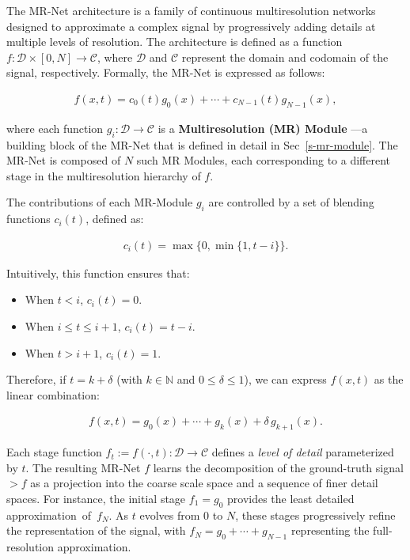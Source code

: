 The MR-Net architecture is a family of continuous multiresolution networks designed to approximate a complex signal by progressively adding details at multiple levels of resolution. The architecture is defined as a function \( f:\mathcal{D} \times [0,N] \to \mathcal{C} \), where \(\mathcal{D}\) and \(\mathcal{C}\) represent the domain and codomain of the signal, respectively. Formally, the MR-Net is expressed as follows:

\begin{align}\label{e-mrnet}
f(x,t) = c_0(t) g_0(x) + \cdots + c_{N-1}(t) g_{N-1}(x),
\end{align}

where each function \( g_i : \mathcal{D} \to \mathcal{C} \) is a \textbf{Multiresolution (MR) Module} —a building block of the MR-Net that is defined in detail in Sec~\ref{s-mr-module}. The MR-Net is composed of \( N \) such MR Modules, each corresponding to a different stage in the multiresolution hierarchy of \( f \). 

The contributions of each MR-Module \( g_i \) are controlled by a set of blending functions \( c_i(t) \), defined as:

\begin{align}\label{e-control}
c_i(t) = \max \Big\{ 0, \min \big\{ 1, t - i \big\} \Big\}.
\end{align}

Intuitively, this function ensures that:

\begin{itemize}
    \item When \( t < i \), \( c_i(t) = 0 \).
    \item When \( i \leq t \leq i+1 \), \( c_i(t) = t - i \).
    \item When \( t > i + 1 \), \( c_i(t) = 1 \).
\end{itemize}

Therefore, if \( t = k + \delta \) (with \( k \in \mathbb{N} \) and \( 0 \leq \delta \leq 1 \)), we can express \( f(x, t) \) as the linear combination:

\begin{align}
f(x, t) = g_0(x) + \cdots + g_k(x) + \delta \, g_{k+1}(x).
\end{align}

Each stage function \( f_t := f(\cdot, t) : \mathcal{D} \to \mathcal{C} \) defines a \textit{level of detail} parameterized by \( t \). The resulting MR-Net $f$ learns the decomposition of the ground-truth signal $\gt{f}$ as a projection into the coarse scale space and a sequence of finer detail spaces. For instance, the initial stage $f_1=g_0$ provides the least detailed approximation~of~$f_N$. As \( t \) evolves from 0 to \( N \), these stages progressively refine the representation of the signal, with \( f_N = g_0 + \cdots + g_{N-1} \) representing the full-resolution approximation.

